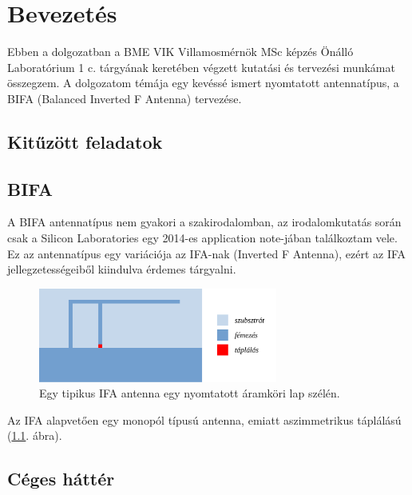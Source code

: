\chapter{Bevezetés}
Ebben a dolgozatban a BME VIK Villamosmérnök MSc képzés Önálló Laboratórium 1 c. tárgyának keretében végzett kutatási és tervezési munkámat összegzem. A dolgozatom témája egy kevéssé ismert nyomtatott antennatípus, a BIFA (Balanced Inverted F Antenna) tervezése.
\section{Kitűzött feladatok}
\section{BIFA}
\par A BIFA antennatípus nem gyakori a szakirodalomban, az irodalomkutatás során csak a Silicon Laboratories egy 2014-es application note-jában \cite{an847} találkoztam vele. Ez az antennatípus egy variációja az IFA-nak (Inverted F Antenna), ezért az IFA jellegzetességeiből kiindulva érdemes tárgyalni.
\begin{figure}[h]
	\centering
	\includegraphics[width=0.7\textwidth]{kep/tipikus_ifa.pdf}
	\caption{Egy tipikus IFA antenna egy nyomtatott áramköri lap szélén.}
	\label{fig:tipikus_ifa}
\end{figure}
\par Az IFA alapvetően egy monopól típusú antenna, emiatt aszimmetrikus táplálású (\ref{fig:tipikus_ifa}. ábra). 
\section{Céges háttér}

